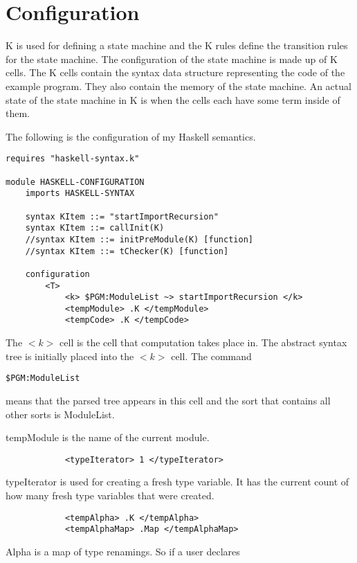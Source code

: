 \chapter{Configuration}
K is used for defining a state machine and the K rules define the transition rules for the state machine. The configuration of the state machine is made up of K cells. The K cells contain the syntax data structure representing the code of the example program. They also contain the memory of the state machine. An actual state of the state machine in K is when the cells each have some term inside of them.

The following is the configuration of my Haskell semantics.
\begin{lstlisting}
requires "haskell-syntax.k"

module HASKELL-CONFIGURATION
    imports HASKELL-SYNTAX

    syntax KItem ::= "startImportRecursion"
    syntax KItem ::= callInit(K)
    //syntax KItem ::= initPreModule(K) [function]
    //syntax KItem ::= tChecker(K) [function]

    configuration 
        <T>
            <k> $PGM:ModuleList ~> startImportRecursion </k>
            <tempModule> .K </tempModule>
            <tempCode> .K </tempCode>
\end{lstlisting}

The $<k>$ cell is the cell that computation takes place in.
The abstract syntax tree is initially placed into the $<k>$ cell.
The command
\begin{lstlisting}
$PGM:ModuleList
\end{lstlisting}
means that the parsed tree appears in this cell and the sort that contains all other sorts is ModuleList.

tempModule is the name of the current module.

\begin{lstlisting}
            <typeIterator> 1 </typeIterator>
\end{lstlisting}

typeIterator is used for creating a fresh type variable. It has the current count of how many fresh type variables that were created.

\begin{lstlisting}
            <tempAlpha> .K </tempAlpha>
            <tempAlphaMap> .Map </tempAlphaMap>
\end{lstlisting}

Alpha is a map of type renamings. So if a user declares

